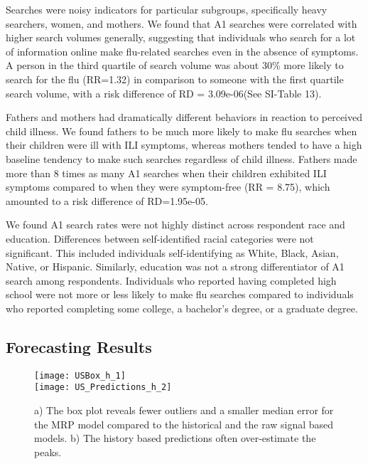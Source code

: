 \documentclass[fleqn,10pt]{wlscirep}
\begin{document}
Searches were noisy indicators for particular subgroups, specifically heavy searchers, women, and mothers. We found that A1 searches were correlated with higher search volumes generally, suggesting that individuals who search for a lot of information online make flu-related searches even in the absence of symptoms. A person in the third quartile of search volume was about 30\% more likely to search for the flu (RR=1.32) in comparison to someone with the first quartile search volume, with a risk difference of RD = 3.09e-06(See SI-Table 13). 

Fathers and mothers had dramatically different behaviors in reaction to perceived child illness. We found fathers to be much more likely to make flu searches when their children were ill with ILI symptoms, whereas mothers tended to have a high baseline tendency to make such searches regardless of child illness. Fathers made more than 8 times as many A1 searches when their children exhibited ILI symptoms compared to when they were symptom-free (RR = 8.75), which amounted to a risk difference of RD=1.95e-05.

We found A1 search rates were not highly distinct across respondent race and education. Differences between self-identified racial categories were not significant. This included individuals self-identifying as White, Black, Asian, Native, or Hispanic. Similarly, education was not a strong differentiator of A1 search among respondents. Individuals who reported having completed high school were not more or less likely to make flu searches compared to individuals who reported completing some college, a bachelor's degree, or a graduate degree. 

\subsection*{Forecasting Results}

 \begin{figure}%
 \centering
 \texttt{[image: USBox\_h\_1]}\\
 \texttt{[image: US\_Predictions\_h\_2]}
 \caption{a) The box plot reveals fewer outliers and a smaller median error for the MRP model compared to the historical and the raw signal based models. b) The history based predictions often over-estimate the peaks.}
  \label{fig:US_Box}
 \end{figure}
 
\end{document}
